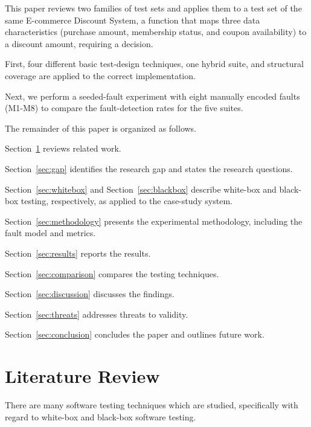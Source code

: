 \documentclass[conference]{IEEEtran}
\begin{document}
This paper reviews two families of test sets and applies them to a test set of the same E-commerce Discount System, a function that maps three data characteristics (purchase amount, membership status, and coupon availability) to a discount amount, requiring a decision.

First, four different basic test-design techniques, one hybrid suite, and structural coverage are applied to the correct implementation.

Next, we perform a seeded-fault experiment with eight manually encoded faults (M1-M8) to compare the fault-detection rates for the five suites.



The remainder of this paper is organized as follows.

Section~\ref{sec:litreview} reviews related work.

Section~\ref{sec:gap} identifies the research gap and states the research questions.

Section~\ref{sec:whitebox} and Section~\ref{sec:blackbox} describe white-box and black-box testing, respectively, as applied to the case-study system.

Section~\ref{sec:methodology} presents the experimental methodology, including the fault model and metrics.

Section~\ref{sec:results} reports the results.

Section~\ref{sec:comparison} compares the testing techniques.

Section~\ref{sec:discussion} discusses the findings.

Section~\ref{sec:threats} addresses threats to validity.

Section~\ref{sec:conclusion} concludes the paper and outlines future work.






\section{Literature Review}

\label{sec:litreview}



There are many software testing techniques which are studied, specifically with regard to white-box and black-box software testing.
\end{document}
